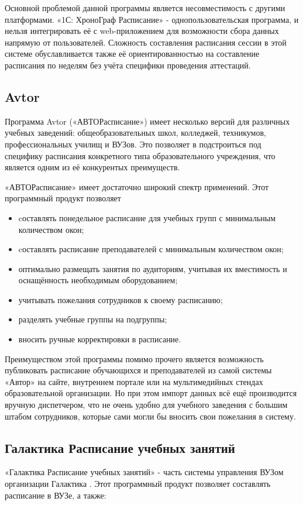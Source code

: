 Основной проблемой данной программы является несовместимость с другими платформами. «1С: ХроноГраф Расписание» - однопользовательская программа, и нельзя интегрировать её с web-приложением для возможности сбора данных напрямую от пользователей. Сложность составления расписания сессии в этой системе обуславливается также её ориентированностью на составление расписания по неделям без учёта специфики проведения аттестаций.

\subsection{Avtor}%
Программа Avtor («АВТОРасписание»)  \cite{avtor} имеет несколько версий для различных учебных заведений: общеобразовательных школ, колледжей, техникумов, профессиональных училищ и ВУЗов. Это позволяет в подстроиться под специфику расписания конкретного типа образовательного учреждения, что является одним из её конкурентых преимуществ.

«АВТОРасписание» имеет достаточно широкий спектр применений. Этот программный продукт позволяет
\begin{itemize}
	\item cоставлять понедельное расписание для учебных групп с минимальным количеством окон;
	\item cоставлять расписание преподавателей с минимальным количеством окон;
	\item оптимально размещать занятия по аудиториям, учитывая их вместимость и оснащённость необходимым оборудованием;
	\item учитывать пожелания сотрудников к своему расписанию;
	\item разделять учебные группы на подгруппы;
	\item вносить ручные корректировки в расписание.
\end{itemize}

Преимуществом этой программы помимо прочего является возможность публиковать расписание обучающихся и преподавателей из самой системы «Автор» на сайте, внутреннем портале или на мультимедийных стендах образовательной организации. Но при этом импорт данных всё ещё производится вручную диспетчером, что не очень удобно для учебного заведения с большим штабом сотрудников, которые сами могли бы вносить свои пожелания в систему.

\subsection{Галактика Расписание учебных занятий}
«Галактика Расписание учебных занятий» - часть системы управления ВУЗом организации Галактика  \cite{galaktica}. Этот программный продукт позволяет составлять расписание в ВУЗе, а также:

